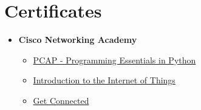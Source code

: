 \documentclass[letterpaper,11pt]{article}
\newcommand{\resumeSubHeadingListStart}{\begin{itemize}[leftmargin=*]}
\newcommand{\resumeSubHeadingListEnd}{\end{itemize}}
\begin{document}
\section{Certificates}
\resumeSubHeadingListStart
    \item{
        \textbf{Cisco Networking Academy}
        {
            \resumeSubHeadingListStart
                \item{\href{https://github.com/aleemont1/curriculum-vitae/blob/main/certificates/PYTHON-2020_certificate.pdf}{PCAP - Programming Essentials in Python}}
                \item{\href{https://github.com/aleemont1/curriculum-vitae/blob/main/certificates/IOT-2018_certificate.pdf}{Introduction to the Internet of Things}}
                \item{\href{https://github.com/aleemont1/curriculum-vitae/blob/main/certificates/GetConnected-2017_certificate.pdf}{Get Connected}}
            \resumeSubHeadingListEnd
        }
    }
\begin{comment}    
    \item{
        \textbf{English}
        {
            \resumeSubHeadingListStart
                \item{\href{https://github.com/aleemont1/curriculum-vitae/blob/main/certificates/English_C1.pdf}{C1 Level Certificate}}
            \resumeSubHeadingListEnd
        }
    }
\end{comment}
\resumeSubHeadingListEnd

\end{document}
